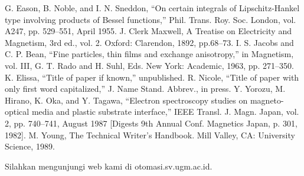 \documentclass{article}
\begin{document}
\begin{thebibliography}{00}
	
	 G. Eason, B. Noble, and I. N. Sneddon, ``On certain integrals of Lipschitz-Hankel type involving products of Bessel functions,'' Phil. Trans. Roy. Soc. London, vol. A247, pp. 529--551, April 1955.
	 J. Clerk Maxwell, A Treatise on Electricity and Magnetism, 3rd ed., vol. 2. Oxford: Clarendon, 1892, pp.68--73.
	 I. S. Jacobs and C. P. Bean, ``Fine particles, thin films and exchange anisotropy,'' in Magnetism, vol. III, G. T. Rado and H. Suhl, Eds. New York: Academic, 1963, pp. 271--350.
	 K. Elissa, ``Title of paper if known,'' unpublished.
	 R. Nicole, ``Title of paper with only first word capitalized,'' J. Name Stand. Abbrev., in press.
	 Y. Yorozu, M. Hirano, K. Oka, and Y. Tagawa, ``Electron spectroscopy studies on magneto-optical media and plastic substrate interface,'' IEEE Transl. J. Magn. Japan, vol. 2, pp. 740--741, August 1987 [Digests 9th Annual Conf. Magnetics Japan, p. 301, 1982].
	 M. Young, The Technical Writer's Handbook. Mill Valley, CA: University Science, 1989.
\end{thebibliography}
\vspace{12pt}
\color{red}
Silahkan mengunjungi web kami di otomasi.sv.ugm.ac.id.  
\end{document}
